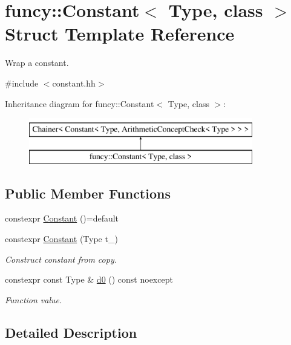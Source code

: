 \hypertarget{structfuncy_1_1Constant}{\section{funcy\-:\-:Constant$<$ Type, class $>$ Struct Template Reference}
\label{structfuncy_1_1Constant}
}


Wrap a constant.  




{\ttfamily \#include $<$constant.\-hh$>$}

Inheritance diagram for funcy\-:\-:Constant$<$ Type, class $>$\-:\begin{figure}[H]
\begin{center}
\leavevmode
\includegraphics[height=2.000000cm]{structfuncy_1_1Constant}
\end{center}
\end{figure}
\subsection*{Public Member Functions}
\begin{DoxyCompactItemize}
\item 
constexpr \hyperlink{structfuncy_1_1Constant_a451d978b3cbf3bd102ef5ab6fa5c076a}{Constant} ()=default
\item 
constexpr \hyperlink{structfuncy_1_1Constant_ad74e5f0082b65593e3515aa34675e4ca}{Constant} (Type t\-\_\-)
\begin{DoxyCompactList}\small\item\em Construct constant from copy. \end{DoxyCompactList}\item 
constexpr const Type \& \hyperlink{structfuncy_1_1Constant_a1a52beecbd69abe363c4a44975da45c1}{d0} () const noexcept
\begin{DoxyCompactList}\small\item\em Function value. \end{DoxyCompactList}\end{DoxyCompactItemize}


\subsection{Detailed Description}
